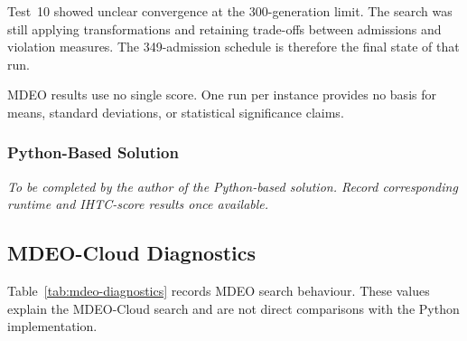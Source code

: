 \documentclass[11pt,a4paper]{article}
\begin{document}
Test~10 showed unclear convergence at the 300-generation limit. The search was still applying transformations and retaining trade-offs between admissions and violation measures. The 349-admission schedule is therefore the final state of that run.

MDEO results use no single score. One run per instance provides no basis for means, standard deviations, or statistical significance claims.

\subsubsection{Python-Based Solution}

\textit{To be completed by the author of the Python-based solution. Record corresponding runtime and IHTC-score results once available.}

\subsection{MDEO-Cloud Diagnostics}

Table~\ref{tab:mdeo-diagnostics} records MDEO search behaviour. These values explain the MDEO-Cloud search and are not direct comparisons with the Python implementation.

\begin{table}[htbp]
\centering
\scriptsize
{}
\caption{MDEO-Cloud search diagnostics.}
\label{tab:mdeo-diagnostics}
\end{table}
\end{document}
